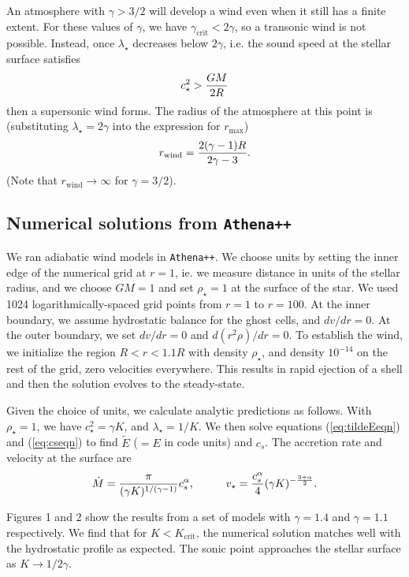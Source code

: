 \documentclass[preprint,12pt]{aastex}
\begin{document}
An atmosphere with $\gamma>3/2$ will develop a wind even when it still has a finite extent. For these values of $\gamma$, we have $\gamma_\mathrm{crit}<2\gamma$, so a transonic wind is not possible. Instead, once $\lambda_\star$ decreases below $2\gamma$, i.e. the sound speed at the stellar surface satisfies 
\begin{equation}
c_\star^2 > {GM\over 2R}
\end{equation}
then a supersonic wind forms. The radius of the atmosphere at this point is (substituting $\lambda_\star=2\gamma$ into the expression for $r_\mathrm{max}$)
\begin{equation}
r_\mathrm{wind} = {2(\gamma-1)R\over 2\gamma-3}.
\end{equation}
(Note that $r_\mathrm{wind}\rightarrow\infty$ for $\gamma=3/2$). 


\subsection{Numerical solutions from \texttt{Athena++}}

We ran adiabatic wind models in \texttt{Athena++}. We choose units by setting the inner edge of the numerical grid at $r=1$, ie. we measure distance in units of the stellar radius, and we choose $GM=1$ and set $\rho_\star=1$ at the surface of the star. We used 1024 logarithmically-spaced grid points from $r=1$ to $r=100$. At the inner boundary, we assume hydrostatic balance for the ghost cells, and $dv/dr=0$. At the outer boundary, we set $dv/dr=0$ and $d(r^2\rho)/dr=0$. To establish the wind, we initialize the region $R<r<1.1R$ with density $\rho_\star$, and density $10^{-14}$ on the rest of the grid, zero velocities everywhere. This results in rapid ejection of a shell and then the solution evolves to the steady-state.

Given the choice of units, we calculate analytic predictions as follows. With $\rho_\star=1$, we have $c_\star^2=\gamma K$, and $\lambda_\star = 1/K$. 
We then solve equations (\ref{eq:tildeEeqn}) and (\ref{eq:cseqn}) to find $\tilde{E}$ ($=E$ in code units) and $c_s$. The accretion rate and velocity at the surface are
\begin{equation}
\dot{M} =  {\pi\over (\gamma K)^{1/(\gamma-1)}}c_s^\alpha,\hspace{1cm}
v_\star = {c_s^\alpha \over 4} (\gamma K)^{-{3+\alpha\over 2}}.
\end{equation}

Figures 1 and 2 show the results from a set of models with $\gamma=1.4$ and $\gamma=1.1$ respectively. We find that for $K<K_\mathrm{crit}$, the numerical solution matches well with the hydrostatic profile as expected. The sonic point approaches the stellar surface as $K\rightarrow 1/2\gamma$. 
\end{document}
